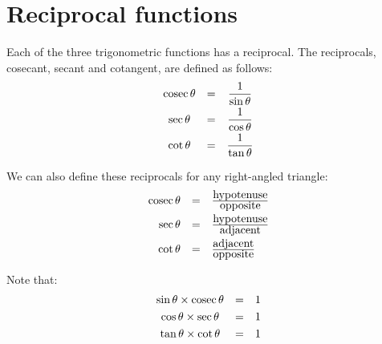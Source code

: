 \section{Reciprocal functions}
Each of the three trigonometric functions has a reciprocal. The
reciprocals, cosecant, secant and cotangent, are defined as follows:
\begin{equation*}
\begin{array}{ccc}\cosec \theta & =& \dfrac{1}{\sin \theta } \vspace{3pt}\\
 \sec \theta & =& \dfrac{1}{\cos \theta } \vspace{3pt}\\
 \cot \theta & =& \dfrac{1}{\tan \theta }
\end{array}
\end{equation*}

We can also define these reciprocals for any right-angled triangle:
\begin{equation*}
\begin{array}{ccc}\hfill \cosec \theta & =& \frac{\mbox{hypotenuse}}{\mbox{opposite}}\hfill \vspace{3pt}\\
 \hfill \sec \theta & =& \frac{\mbox{hypotenuse}}{\mbox{adjacent}}\hfill \vspace{3pt}\\
 \hfill \cot \theta & =& \frac{\mbox{adjacent}}{\mbox{opposite}}\hfill 
\end{array}
\end{equation*}

Note that:
\begin{equation*}
\begin{array}{ccc}\sin \theta \times \cosec \theta & =& 1 \vspace{3pt}\\
 \cos \theta \times \sec \theta & =& 1 \vspace{3pt}\\
\tan \theta \times \cot \theta & =& 1
\end{array}
\end{equation*}

